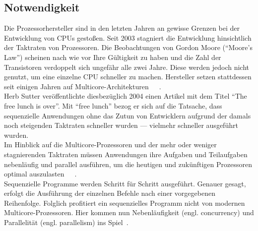 \subsection{Notwendigkeit}\label{subsec:notwendigkeit}
Die Prozessorhersteller sind in den letzten Jahren an gewisse Grenzen bei der Entwicklung von CPUs gestoßen. Seit 2003 stagniert die Entwicklung hinsichtlich der Taktraten von Prozessoren. Die Beobachtungen von Gordon Moore (\enquote{Moore's Law}) scheinen nach wie vor Ihre Gültigkeit zu haben und die Zahl der Transistoren verdoppelt sich ungefähr alle zwei Jahre. Diese werden jedoch nicht genutzt, um eine einzelne CPU schneller zu machen. Hersteller setzen stattdessen seit einigen Jahren auf Multicore-Architekturen~\cite[S.~1]{butcher_seven_2014}~\cite[S.~108]{vernon_reactive_2016}~\cite{sutter_free_2004}.\\
Herb Sutter veröffentlichte diesbezüglich 2004 einen Artikel mit dem Titel \enquote{The free lunch is over}. Mit \enquote{free lunch} bezog er sich auf die Tatsache, dass sequenzielle Anwendungen ohne das Zutun von Entwicklern aufgrund der damals noch steigenden Taktraten schneller wurden --- vielmehr schneller ausgeführt wurden.\\
Im Hinblick auf die Multicore-Prozessoren und der mehr oder weniger stagnierenden Taktraten müssen Anwendungen ihre Aufgaben und Teilaufgaben nebenläufig und parallel ausführen, um die heutigen und zukünftigen Prozessoren optimal auszulasten~\cite[S.~45]{kuhn_reactive_2015}~\cite{sutter_free_2004}~\cite[S.~1]{butcher_seven_2014}.\\
Sequenzielle Programme werden Schritt für Schritt ausgeführt. Genauer gesagt, erfolgt die Ausführung der einzelnen Befehle nach einer vorgegebenen Reihenfolge. Folglich profitiert ein sequenzielles Programm nicht von modernen Multicore-Prozessoren. Hier kommen nun Nebenläufigkeit (engl. concurrency) und Parallelität (engl. parallelism) ins Spiel~\cite[S.~3]{butcher_seven_2014}.\\

